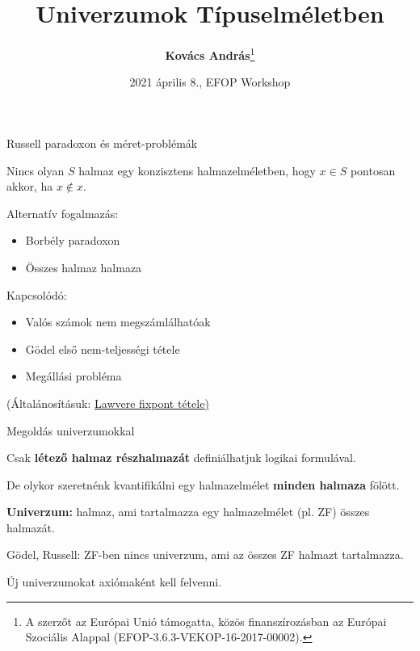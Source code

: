 \documentclass[dvipsnames,10pt,aspectratio=169]{beamer}
\title{Univerzumok Típuselméletben}
\date{2021 április 8., EFOP Workshop}
\author{\normalsize{\vspace{-1em}\textbf{Kovács András}\footnote{A szerzőt az Európai Unió támogatta, közös finanszírozásban az Európai Szociális Alappal (EFOP-3.6.3-VEKOP-16-2017-00002).\vspace{0.5em}}}}
\begin{document}
\maketitle


\begin{frame}{Russell paradoxon és méret-problémák}

Nincs olyan $S$ halmaz egy konzisztens halmazelméletben, hogy $x \in S$ pontosan akkor, ha $x \notin
x$.
\vspace{1em}

Alternatív fogalmazás:
\begin{itemize}
  \item Borbély paradoxon
  \item Összes halmaz halmaza
\end{itemize}
\vspace{1em}

Kapcsolódó:
\begin{itemize}
  \item Valós számok nem megszámlálhatóak
  \item Gödel első nem-teljességi tétele
  \item Megállási probléma
\end{itemize}
\vspace{1em}

{\footnotesize (Általánosításuk: \href{https://arxiv.org/pdf/math/0305282.pdf}{Lawvere fixpont tétele)}}
\end{frame}


\begin{frame}{Megoldás univerzumokkal}

Csak \textbf{létező halmaz részhalmazát} definiálhatjuk logikai formulával.
\vspace{1em}

De olykor szeretnénk kvantifikálni egy halmazelmélet \textbf{minden halmaza}
fölött.
\vspace{1em}

\textbf{Univerzum:} halmaz, ami tartalmazza egy halmazelmélet (pl. ZF) összes halmazát.
\vspace{1em}

Gödel, Russell: ZF-ben nincs univerzum, ami az összes ZF halmazt tartalmazza.
\vspace{1em}

Új univerzumokat axiómaként kell felvenni.
\end{frame}
\end{document}
